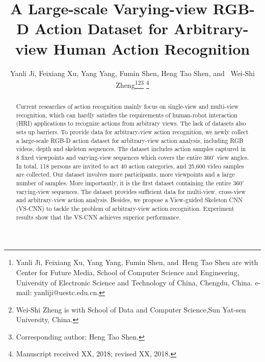 \documentclass[journal]{IEEEtran}
\begin{document}
\title{A Large-scale Varying-view RGB-D Action Dataset for Arbitrary-view Human Action Recognition}

\author{Yanli Ji, Feixiang Xu, Yang Yang, Fumin Shen, Heng Tao Shen,
        and~ Wei-Shi Zheng\thanks{Yanli Ji, Feixiang Xu, Yang Yang, Fumin Shen, and~Heng Tao Shen are with Center for Future Media, School of Computer Science and Engineering, University of Electronic Science and Technology of China, Chengdu, China. e-mail: yanliji@uestc.edu.cn.}\thanks{Wei-Shi Zheng is with School of Data and Computer Science,Sun Yat-sen University, China.}\thanks{Corresponding author: Heng Tao Shen.}
\thanks{Manuscript received XX, 2018; revised XX, 2018.}}















\maketitle

\begin{abstract}
Current researches of action recognition mainly focus on single-view and multi-view recognition, which can hardly satisfies the requirements of human-robot interaction (HRI) applications to recognize actions from arbitrary views. The lack of datasets also sets up barriers. To provide data for arbitrary-view action recognition, we newly collect a large-scale RGB-D action dataset for arbitrary-view action analysis, including RGB videos, depth and skeleton sequences. The dataset includes action samples captured in 8 fixed viewpoints and varying-view sequences which covers the entire $360^\circ$ view angles. In total, 118 persons are invited to act 40 action categories, and 25,600 video samples are collected. Our dataset involves more participants, more viewpoints and a large number of samples. More importantly, it is the first dataset containing the entire $360^\circ$ varying-view sequences. The dataset provides sufficient data for multi-view, cross-view and arbitrary-view action analysis. Besides, we propose a View-guided Skeleton CNN (VS-CNN) to tackle the problem of arbitrary-view action recognition. Experiment results show that the VS-CNN achieves superior performance.
\end{abstract}
\end{document}
